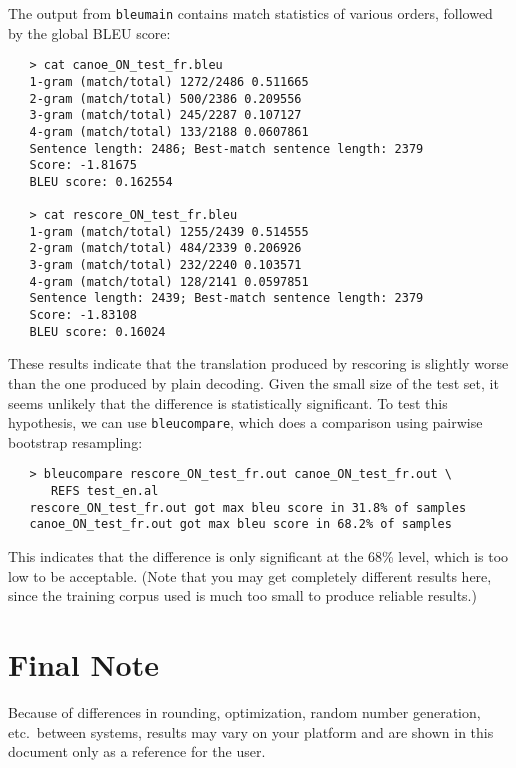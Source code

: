 \documentclass[11pt]{article}
\begin{document}
The output from {\tt bleumain} contains match statistics of various orders,
followed by the global BLEU score:
\begin{verbatim}
   > cat canoe_ON_test_fr.bleu
   1-gram (match/total) 1272/2486 0.511665
   2-gram (match/total) 500/2386 0.209556
   3-gram (match/total) 245/2287 0.107127
   4-gram (match/total) 133/2188 0.0607861
   Sentence length: 2486; Best-match sentence length: 2379
   Score: -1.81675
   BLEU score: 0.162554

   > cat rescore_ON_test_fr.bleu
   1-gram (match/total) 1255/2439 0.514555
   2-gram (match/total) 484/2339 0.206926
   3-gram (match/total) 232/2240 0.103571
   4-gram (match/total) 128/2141 0.0597851
   Sentence length: 2439; Best-match sentence length: 2379
   Score: -1.83108
   BLEU score: 0.16024
\end{verbatim}
These results indicate that the translation produced by rescoring is slightly
worse than the one produced by plain decoding. Given the small size of the
test set, it seems unlikely that the difference is statistically
significant. To test this hypothesis, we can use {\tt bleucompare}, which does
a comparison using pairwise bootstrap resampling:
\begin{verbatim}
   > bleucompare rescore_ON_test_fr.out canoe_ON_test_fr.out \
      REFS test_en.al
   rescore_ON_test_fr.out got max bleu score in 31.8% of samples
   canoe_ON_test_fr.out got max bleu score in 68.2% of samples
\end{verbatim}
This indicates that the difference is only significant at the 68\% level, which
is too low to be acceptable.  (Note that you may get completely different
results here, since the training corpus used is much too small to produce
reliable results.)

\section{Final Note}
Because of differences in rounding, optimization, random number generation,
etc.\ between systems, results may vary on your platform and are shown in this
document only as a reference for the user.
\end{document}
